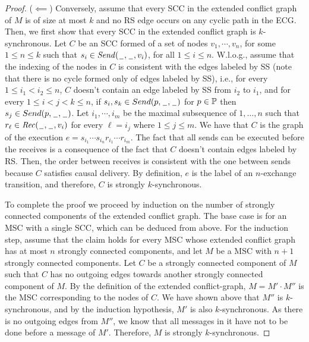 \begin{proof}
	($\impliedby$) Conversely, assume that  every SCC in the extended conflict graph of $M$ is of size at most $k$ and no RS edge occurs on any cyclic path in the ECG. Then, we first show that every SCC in the extended conflict graph is $k$-synchronous.
  Let $C$ be an SCC formed of a set of nodes $v_1,\cdots, v_n$, for some $1 \leq n \leq k$  such that $s_i \in {\mathit{Send}(\hspace{0.1em}\underline{\hspace{0.5em}}\hspace{0.1em},\hspace{0.1em}\underline{\hspace{0.5em}}\hspace{0.1em},v_i)}$, for all $1 \leq i \leq n$.
  W.l.o.g., assume that the indexing of the
	nodes in $C$ is consistent with the edges labeled by SS (note that there is no cycle formed only of edges labeled by SS), i.e., for every $1 \leq i_1 < i_2 \leq n$, $C$ doesn’t contain an edge labeled by SS from $i_2$ to $i_1$, and for every $1\leq i <j <k \leq n$, if
  $s_i,s_k \in Send(p,\hspace{0.1em}\underline{\hspace{0.5em}}\hspace{0.1em}, \hspace{0.1em}\underline{\hspace{0.5em}}\hspace{0.1em})$ for $p \in \mathbb{P}$ then $s_j \in Send(p,\hspace{0.1em}\underline{\hspace{0.5em}}\hspace{0.1em}, \hspace{0.1em}\underline{\hspace{0.5em}}\hspace{0.1em})$.
  Let  $i_1,\cdots,i_m$ be the maximal subsequence of $1,\ldots ,n$ such that $r_\ell \in {\mathit{Rec}(\hspace{0.1em}\underline{\hspace{0.5em}}\hspace{0.1em},\hspace{0.1em}\underline{\hspace{0.5em}}\hspace{0.1em},v_i)}$ for every $\ell = i_j$ where $1 \leq j \leq m$.
  We have that $C$ is the graph of the execution $e = s_{i_1} \cdots  s_{i_n} r_{i_1} \cdots r_{i_m}$.
	The fact that all sends can be executed before the receives is a consequence of the fact that $C$ doesn’t contain edges labeled by RS.
  Then, the order between receives is consistent with the one between sends because $C$ satisfies causal delivery. By definition, $e$ is the label of an $n$-exchange transition, and therefore, $C$ is strongly $k$-synchronous.

	To complete the proof we proceed by induction on the number of strongly connected components of the extended conflict graph. The base case is for an MSC with a single SCC, which can be deduced from above. For the induction step, assume that the claim holds for every MSC whose extended conflict graph has at most $n$ strongly connected components, and let $M$ be a MSC with $n+1$ strongly connected components. Let $C$ be a strongly connected component of $M$ such that $C$ has no outgoing edges towards another strongly connected component of $M$. By the definition of the extended conflict-graph, $M= M'\cdot M''$ is the MSC corresponding to the nodes of $C$. We have shown above that $M''$ is $k$-synchronous, and by the induction hypothesis, $M'$ is also $k$-synchronous. As there is no outgoing edges from $M''$, we know that all messages in it have not to be done before a message of $M'$. Therefore, $M$ is strongly $k$-synchronous.
\end{proof}



